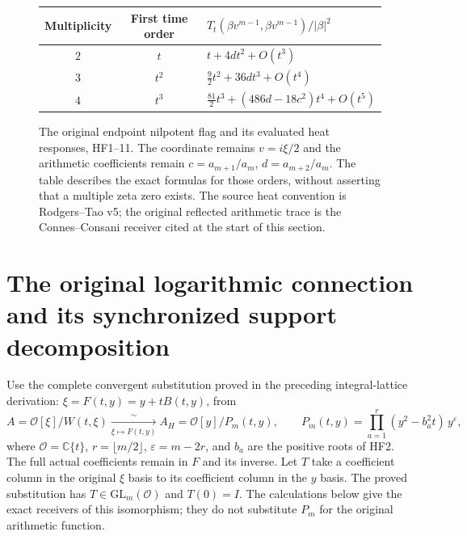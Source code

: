 \documentclass[11pt,a4paper]{article}
\theoremstyle{definition}\newtheorem{definition}[theorem]{Definition}
\begin{document}
\begin{figure}[p]
\centering
{}
\par\vspace{6mm}
\renewcommand{\arraystretch}{1.4}
\begin{tabular}{ccl}
\toprule
Multiplicity&First time order&$T_t(\beta v^{m-1},\beta v^{m-1})/|\beta|^2$\\
\midrule
$2$&$t$&$t+4dt^2+O(t^3)$\\
$3$&$t^2$&$\frac92t^2+36dt^3+O(t^4)$\\
$4$&$t^3$&$\frac{81}2t^3+(486d-18c^2)t^4+O(t^5)$\\
\bottomrule
\end{tabular}
\caption{The original endpoint nilpotent flag and its evaluated heat
responses, HF1--11. The coordinate remains $v=i\xi/2$ and the
arithmetic coefficients remain $c=a_{m+1}/a_m$, $d=a_{m+2}/a_m$.
The table describes the exact formulas for those orders, without
asserting that a multiple zeta zero exists. The source heat convention
is Rodgers--Tao v5; the original reflected arithmetic trace is the
Connes--Consani receiver cited at the start of this section.}
\end{figure}

\section{The original logarithmic connection and its synchronized support decomposition}
\label{sec:heat-lattice-receiver}

Use the complete convergent substitution proved in the preceding
integral-lattice derivation: $\xi=F(t,y)=y+tB(t,y)$, from
\[
 A=\mathcal O[\xi]/W(t,\xi)
       \xrightarrow[\xi\mapsto F(t,y)]{\ \sim\ }
 A_H=\mathcal O[y]/P_m(t,y),\qquad
 P_m(t,y)=\prod_{a=1}^r(y^2-b_a^2t)\,y^\varepsilon,
 \tag{HL1}
\]
where $\mathcal O=\mathbb C\{t\}$, $r=\lfloor m/2\rfloor$,
$\varepsilon=m-2r$, and $b_a$ are the positive roots of HF2.
The full actual coefficients remain in $F$ and its inverse.
Let $T$ take a coefficient column in the original $\xi$ basis to
its coefficient column in the $y$ basis. The proved substitution
has $T\in\mathrm{GL}_m(\mathcal O)$ and $T(0)=I$.
The calculations below give the exact receivers of this isomorphism;
they do not substitute $P_m$ for the original arithmetic function.
\end{document}
